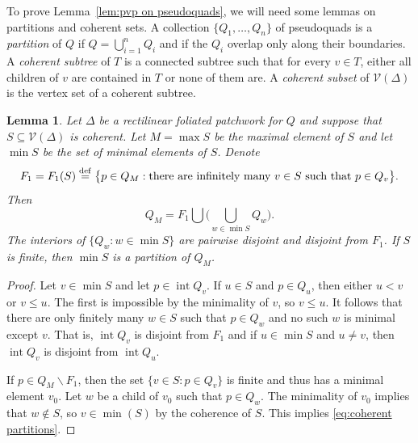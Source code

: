 \documentclass[11pt,reqno]{amsart}
\newcommand{\cV}{\mathcal{V}}
\newcommand{\0}{\mathbf{0}}
\renewcommand{\1}{\mathbf 1}
\renewcommand{\mid}{:}
\renewcommand{\subset}{\subseteq}
\newcommand{\eqdef}{\stackrel{\mathrm{def}}{=}}
\renewcommand{\ge}{\geqslant}
\renewcommand{\le}{\leqslant}
\renewcommand{\setminus}{\smallsetminus}
\newtheorem{lemma}[thm]{Lemma}
\theoremstyle{remark}
\DeclareMathOperator{\inter}{int}
\newcommand{\cVv}{{\mathcal{V}_{\mathsf{V}}}}
\begin{document}
To prove Lemma~\ref{lem:pvp on pseudoquads}, we will need some lemmas on partitions and coherent sets.  A collection $\{Q_1,\dots, Q_n\}$ of pseudoquads is a \emph{partition} of $Q$ if $Q=\bigcup_{i=1}^n Q_i$ and if the $Q_i$ overlap only along their boundaries.  A \emph{coherent subtree} of $T$ is a connected subtree such that for every $v\in T$, either all children of $v$ are contained in $T$ or none of them are.  A \emph{coherent subset} of $\cV(\Delta)$ is the vertex set of a coherent subtree.

\begin{lemma}\label{lem:coherent partitions}
  Let $\Delta$ be a rectilinear foliated patchwork for $Q$ and suppose that $S\subset \cV(\Delta)$ is coherent.  Let $M=\max S$ be the maximal element of $S$ and let $\min S$ be the set of minimal elements of $S$.  Denote
  $$F_1=F_1(S)\eqdef \big\{p\in Q_M\mid \textup{there are infinitely many $v\in S$ such that $p\in Q_v$}\big\}.$$
  Then
  \begin{equation}\label{eq:coherent partitions}
    Q_M=F_1\bigcup \bigg(\bigcup_{w\in \min S} Q_w\bigg).
  \end{equation}
  The interiors of  $\{Q_w: w\in \min S\}$ are pairwise disjoint and disjoint from $F_1$.  If $S$ is finite, then $\min S$ is a partition of $Q_M$.
\end{lemma}
\begin{proof}
  Let $v\in \min S$ and let $p\in \inter Q_v$.  If $u\in S$ and $p\in Q_u$, then either $u<v$ or $v\le u$.  The first is impossible by the minimality of $v$, so $v\le u$.  It follows that there are only finitely many $w\in S$ such that $p\in Q_w$ and no such $w$ is minimal except $v$.  That is, $\inter Q_v$ is disjoint from $F_1$ and if $u\in \min S$ and $u\ne v$, then $\inter Q_v$ is disjoint from $\inter Q_u$.

  If $p\in Q_M\setminus F_1$, then the set $\{v\in S\mid p\in Q_v\}$ is finite and thus has a minimal element $v_0$. Let $w$ be a child of $v_0$ such that $p\in Q_w$. The minimality of $v_0$ implies that $w\not \in S$, so $v\in \min(S)$ by the coherence of $S$.  This implies \eqref{eq:coherent partitions}.
\end{proof}

\end{document}
